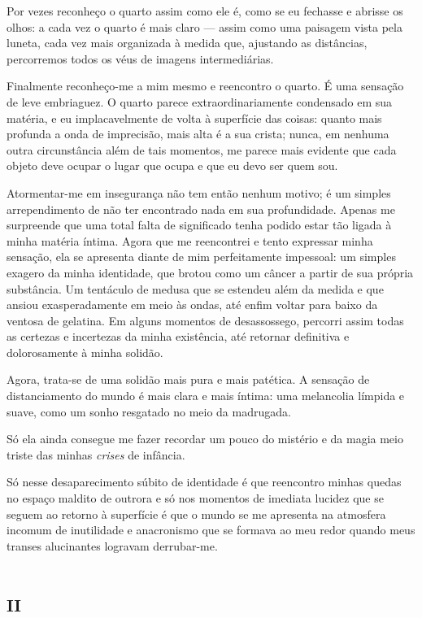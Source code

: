 Por vezes reconheço o quarto assim como ele é, como se eu fechasse e abrisse os olhos: a cada vez o quarto é mais claro --- assim como uma paisagem vista pela luneta, cada vez mais organizada à medida que, ajustando as distâncias, percorremos todos os véus de imagens intermediárias.

Finalmente reconheço-me a mim mesmo e reencontro o quarto. É uma sensação de leve embriaguez. O quarto parece extraordinariamente condensado em sua matéria, e eu implacavelmente de volta à superfície das coisas: quanto mais profunda a onda de imprecisão, mais alta é a sua crista; nunca, em nenhuma outra circunstância além de tais momentos, me parece mais evidente que cada objeto deve ocupar o lugar que ocupa e que eu devo ser quem sou.

Atormentar-me em insegurança não tem então nenhum motivo; é um simples arrependimento de não ter encontrado nada em sua profundidade. Apenas me surpreende que uma total falta de significado tenha podido estar tão ligada à minha matéria íntima. Agora que me reencontrei e tento expressar minha sensação, ela se apresenta diante de mim perfeitamente impessoal: um simples exagero da minha identidade, que brotou como um câncer a partir de sua própria substância. Um tentáculo de medusa que se estendeu além da medida e que ansiou exasperadamente em meio às ondas, até enfim voltar para baixo da ventosa de gelatina. Em alguns momentos de desassossego, percorri assim todas as certezas e incertezas da minha existência, até retornar definitiva e dolorosamente à minha solidão.

Agora, trata-se de uma solidão mais pura e mais patética. A sensação de distanciamento do mundo é mais clara e mais íntima: uma melancolia límpida e suave, como um sonho resgatado no meio da madrugada.

Só ela ainda consegue me fazer recordar um pouco do mistério e da magia meio triste das minhas \textit{crises} de infância.

Só nesse desaparecimento súbito de identidade é que reencontro minhas quedas no espaço maldito de outrora e só nos momentos de imediata lucidez que se seguem ao retorno à superfície é que o mundo se me apresenta na atmosfera incomum de inutilidade e anacronismo que se formava ao meu redor quando meus transes alucinantes logravam derrubar-me.


\chapter*{\huge\centering\textsc{ii}}

